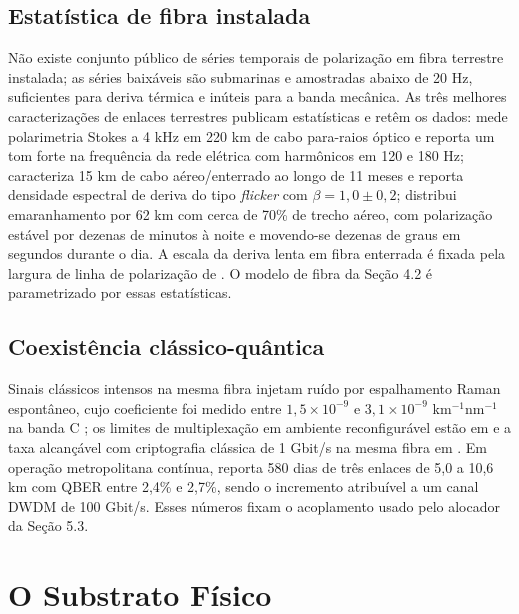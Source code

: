 \documentclass[12pt]{article}
\begin{document}
\subsection{Estatística de fibra instalada}

Não existe conjunto público de séries temporais de polarização em fibra
terrestre instalada; as séries baixáveis são submarinas e amostradas abaixo de
20 Hz, suficientes para deriva térmica e inúteis para a banda mecânica. As três
melhores caracterizações de enlaces terrestres publicam estatísticas e retêm os
dados: \cite{peterson2004} mede polarimetria Stokes a 4 kHz em 220 km de cabo
para-raios óptico e reporta um tom forte na frequência da rede elétrica com
harmônicos em 120 e 180 Hz; \cite{ramaswamy2026} caracteriza 15 km de cabo
aéreo/enterrado ao longo de 11 meses e reporta densidade espectral de deriva do
tipo \emph{flicker} com $\beta = 1{,}0 \pm 0{,}2$; \cite{shi2026} distribui
emaranhamento por 62 km com cerca de 70\% de trecho aéreo, com polarização
estável por dezenas de minutos à noite e movendo-se dezenas de graus em segundos
durante o dia. A escala da deriva lenta em fibra enterrada é fixada pela largura
de linha de polarização de \cite{czegledi2016}. O modelo de fibra da Seção 4.2 é
parametrizado por essas estatísticas.

\subsection{Coexistência clássico-quântica}

Sinais clássicos intensos na mesma fibra injetam ruído por espalhamento Raman
espontâneo, cujo coeficiente foi medido entre $1{,}5\times10^{-9}$ e
$3{,}1\times10^{-9}$ km$^{-1}$nm$^{-1}$ na banda C \cite{kumar2015}; os limites
de multiplexação em ambiente reconfigurável estão em
\cite{peters2009,chapuran2009} e a taxa alcançável com criptografia clássica de
1 Gbit/s na mesma fibra em \cite{eraerds2010}. Em operação metropolitana
contínua, \cite{dynes2019} reporta 580 dias de três enlaces de 5,0 a 10,6 km
com QBER entre 2,4\% e 2,7\%, sendo o incremento atribuível a um canal DWDM de
100 Gbit/s. Esses números fixam o acoplamento usado pelo alocador da
Seção 5.3.

\section{O Substrato Físico}
\end{document}
